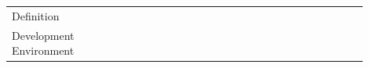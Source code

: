 \documentclass[english, 12pt, a4paper, sci, utf8, a-1b, online]{aaltothesis}
\begin{document}
\begin{center}
\begin{longtable}{p{0.3\linewidth}p{0.6\linewidth}}
    Definition                        & \textcite{how-i-missed-it-before} \newline \textcite{effective-developer-experience} \newline \textcite{what-is-api-developer-experience-and-why-it-matters} \newline \textcite{what-is-developer-experience-everydeveloper} \newline \textcite{what-exactly-is-developer-experience}                                                                                                                                                                                                                                                                                                                                                                                                                                                                                                                                                           \\
    Development Environment           & \textcite{how-i-missed-it-before} \newline \textcite{workflows-for-the-new-developer-experience}                                                                                                                                                                                                                                                                                                                                                                                                                                                                                                                                                                                                                                                                                                                                                \\

\end{longtable}
\end{center}
\end{document}
